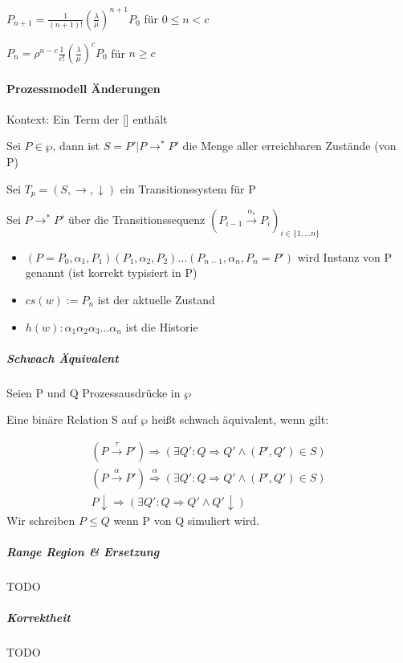 \documentclass[a4paper,12pt,smallheadings]{scrartcl}
\begin{document}
$P_{n+1} = \frac{1}{\left(n+1\right)!} \left(\frac{\lambda}{\mu}\right)^{n+1}P_0$ \quad für $0 \leq n < c$

$P_n = \rho^{n-c} \frac{1}{c!} \left(\frac{\lambda}{\mu}\right)^c P_0$ \quad für $ n \geq c$

\paragraph{Prozessmodell Änderungen} 
Kontext: Ein Term der [] enthält

Sei $P \in \wp$, dann ist $S = {P' | P \rightarrow^* P'}$ die Menge aller erreichbaren Zustände (von P)

Sei $T_p = (S , \rightarrow, \downarrow)$ ein Transitionssystem für P

Sei $P \rightarrow^* P'$ über die Transitionssequenz $(P_{i-1} \overset{\alpha_i}{\rightarrow} P_i)_{i \in \{1, \dots n\}}$
\begin{itemize}
\item $(P = P_0, \alpha_1, P_1)(P_1, \alpha_2, P_2) \dots (P_{n-1}, \alpha_n, P_n = P')$ wird Instanz von P genannt (ist korrekt typisiert in P)
\item $cs(w) := P_n$ ist der aktuelle Zustand
\item $h(w): \alpha_1\alpha_2\alpha_3 \dots \alpha_n$ ist die Historie
\end{itemize}

\subparagraph{Schwach Äquivalent}

Seien P und Q Prozessausdrücke in $\wp$

Eine binäre Relation S auf $\wp$ heißt schwach äquivalent, wenn gilt:

\begin{eqnarray}
(P \overset{\tau}{\rightarrow} P') \Rightarrow (\exists Q': Q \Rightarrow Q' \wedge (P', Q') \in S) \\
(P \overset{\alpha}{\rightarrow} P') \overset{\alpha}{\Rightarrow} (\exists Q': Q \Rightarrow Q' \wedge (P', Q') \in S) \\
P \downarrow \Rightarrow (\exists Q':Q \Rightarrow Q' \wedge Q' \downarrow)
\end{eqnarray}
Wir schreiben $P \leq Q$ wenn P von Q simuliert wird.

\subparagraph{Range Region \& Ersetzung}
TODO

\subparagraph{Korrektheit}
TODO
\end{document}
